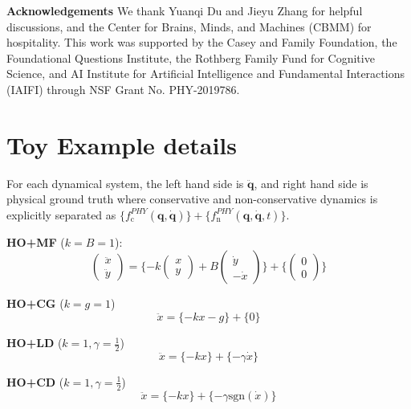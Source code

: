 \documentclass[aps,pre,reprint,superscriptaddress,nofootinbib,amsmath,amssymb]{revtex4-2}
\newcommand{\mat}[1]{\mathbf{#1}}
\newcommand{\q}{\mat{q}}
\newcommand{\qd}{\dot{\mat{q}}}
\newcommand{\qdd}{\ddot{\mat{q}}}
\begin{document}
{\bf Acknowledgements} We thank Yuanqi Du and Jieyu Zhang for helpful discussions, and the Center for Brains, Minds, and Machines (CBMM) for hospitality. This work was supported by the Casey and Family Foundation, the Foundational Questions Institute, the Rothberg Family Fund for Cognitive Science, and AI Institute for Artificial Intelligence and Fundamental Interactions (IAIFI) through NSF Grant No. PHY-2019786.



\clearpage

\onecolumngrid

\appendix


\section{Toy Example details}\label{app:equations}

For each dynamical system, the left hand side is $\qdd$, and right hand side is physical ground truth where conservative and non-conservative dynamics is explicitly separated as $\{f_{\mathrm{c}}^{PHY}(\q,\qd)\}+\{f_{\mathrm{n}}^{PHY}(\q,\qd,t)\}$.

{\bf HO+MF} ($k=B=1$):
\begin{equation}
	\begin{pmatrix}
		\ddot{x}\\
		\ddot{y}
	\end{pmatrix}=\{-k
	\begin{pmatrix}
		x\\
		y
	\end{pmatrix}+B
	\begin{pmatrix}
		\dot{y}\\
		-\dot{x}
	\end{pmatrix}\}+\{
	\begin{pmatrix}
		0\\
		0
	\end{pmatrix}
	\}
\end{equation}

{\bf HO+CG} ($k=g=1$)
\begin{equation}
	\ddot{x} = \{-kx-g\}+\{0\}
\end{equation}

{\bf HO+LD} ($k=1,\gamma=\frac{1}{2}$)
\begin{equation}
	\ddot{x} = \{-kx\}+\{-\gamma\dot{x}\}
\end{equation}

{\bf HO+CD} ($k=1,\gamma=\frac{1}{2}$)
\begin{equation}
	\ddot{x} = \{-kx\}+\{-\gamma \mathrm{sgn}(\dot{x})\}
\end{equation}
\end{document}
